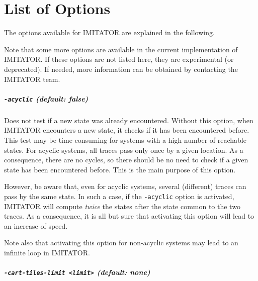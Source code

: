 \documentclass[a4paper,11pt]{report}
\newcommand{\imitator}{\textsf{IMITATOR}}
\newcommand{\styleOption}[1]{\textcolor{optioncolor}{\texttt{#1}}}
\begin{document}
\chapter{List of Options}\label{chapter:options}

The options available for \imitator{} are explained in the following.

Note that some more options are available in the current implementation of \imitator{}.
If these options are not listed here, they are experimental (or deprecated).
If needed, more information can be obtained by contacting the \imitator{} team.


\paragraph{\styleOption{-acyclic} (default: false)}
Does not test if a new state was already encountered.
Without this option, when \imitator{} encounters a new state, it checks if it has been encountered before.
This test may be time consuming for systems with a high number of reachable states.
For acyclic systems, all traces pass only once by a given location.
As a consequence, there are no cycles, so there should be no need to check if a given state has been encountered before.
This is the main purpose of this option.

However, be aware that, even for acyclic systems, several (different) traces can pass by the same state.
In such a case, if the \styleOption{-acyclic} option is activated, \imitator{} will compute \emph{twice} the states after the state common to the two traces.
As a consequence, it is all but sure that activating this option will lead to an increase of speed.

Note also that activating this option for non-acyclic systems may lead to an infinite loop in \imitator{}.


\paragraph{\styleOption{-cart-tiles-limit <limit>} (default: none)}
\end{document}
